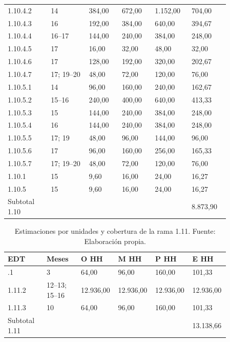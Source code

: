 \documentclass[11pt]{article}
\begin{document}
\begin{longtable}{@{}p{0.17\linewidth}p{0.15\linewidth}p{0.13\linewidth}p{0.13\linewidth}p{0.13\linewidth}p{0.15\linewidth}@{}}
1.10.4.2 & 14 & 384,00 & 672,00 & 1.152,00 & 704,00 \\
1.10.4.3 & 16 & 192,00 & 384,00 & 640,00 & 394,67 \\
1.10.4.4 & 16--17 & 144,00 & 240,00 & 384,00 & 248,00 \\
1.10.4.5 & 17 & 16,00 & 32,00 & 48,00 & 32,00 \\
1.10.4.6 & 17 & 128,00 & 192,00 & 320,00 & 202,67 \\
1.10.4.7 & 17; 19--20 & 48,00 & 72,00 & 120,00 & 76,00 \\
1.10.5.1 & 14 & 96,00 & 160,00 & 240,00 & 162,67 \\
1.10.5.2 & 15--16 & 240,00 & 400,00 & 640,00 & 413,33 \\
1.10.5.3 & 15 & 144,00 & 240,00 & 384,00 & 248,00 \\
1.10.5.4 & 16 & 144,00 & 240,00 & 384,00 & 248,00 \\
1.10.5.5 & 17; 19 & 48,00 & 96,00 & 144,00 & 96,00 \\
1.10.5.6 & 17 & 96,00 & 160,00 & 256,00 & 165,33 \\
1.10.5.7 & 17; 19--20 & 48,00 & 72,00 & 120,00 & 76,00 \\
1.10.1 & 15 & 9,60 & 16,00 & 24,00 & 16,27 \\
1.10.5 & 15 & 9,60 & 16,00 & 24,00 & 16,27 \\
Subtotal 1.10 &  &  &  &  & 8.873,90 \\
\end{longtable}
\endgroup



\begingroup
\small
\begin{longtable}{@{}p{0.17\linewidth}p{0.15\linewidth}p{0.13\linewidth}p{0.13\linewidth}p{0.13\linewidth}p{0.15\linewidth}@{}}
\caption[Estimaciones por unidades y cobertura de la rama 1.11]{Estimaciones por unidades y cobertura de la rama 1.11. Fuente: Elaboración propia.}\label{tab:t15-tareas-11}\\
\toprule
\textbf{EDT} & \textbf{Meses} & \textbf{O HH} & \textbf{M HH} & \textbf{P HH} & \textbf{E HH} \\
\midrule
\endhead
\bottomrule
\endlastfoot
1.11.1 & 3 & 64,00 & 96,00 & 160,00 & 101,33 \\
1.11.2 & 12--13; 15--16 & 12.936,00 & 12.936,00 & 12.936,00 & 12.936,00 \\
1.11.3 & 10 & 64,00 & 96,00 & 160,00 & 101,33 \\
Subtotal 1.11 &  &  &  &  & 13.138,66 \\
\end{longtable}
\endgroup
\end{document}
